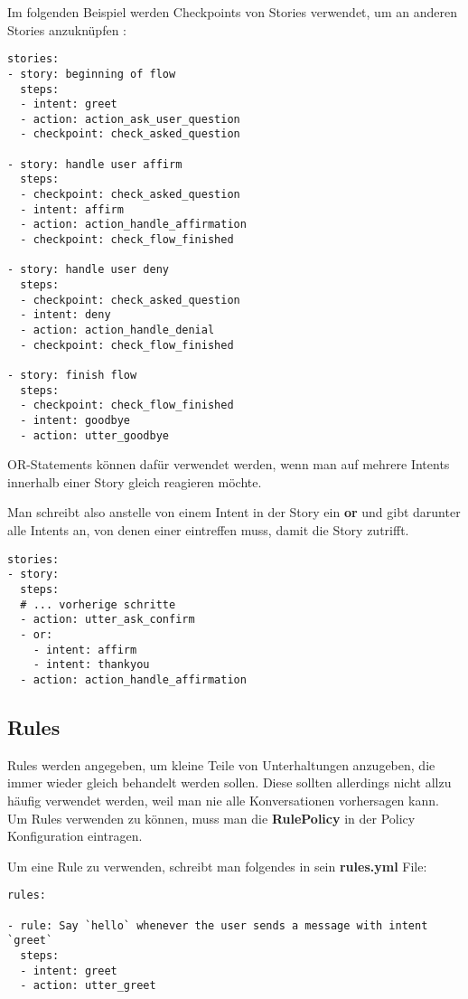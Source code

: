 Im folgenden Beispiel werden Checkpoints von Stories verwendet, um an anderen Stories anzuknüpfen
\cite{checkpoints}
:

\begin{lstlisting}[label={lst: Checkpoints Example}]
stories:
- story: beginning of flow
  steps:
  - intent: greet
  - action: action_ask_user_question
  - checkpoint: check_asked_question

- story: handle user affirm
  steps:
  - checkpoint: check_asked_question
  - intent: affirm
  - action: action_handle_affirmation
  - checkpoint: check_flow_finished

- story: handle user deny
  steps:
  - checkpoint: check_asked_question
  - intent: deny
  - action: action_handle_denial
  - checkpoint: check_flow_finished

- story: finish flow
  steps:
  - checkpoint: check_flow_finished
  - intent: goodbye
  - action: utter_goodbye
\end{lstlisting}

OR-Statements können dafür verwendet werden, wenn man auf mehrere Intents innerhalb einer Story gleich reagieren möchte.
\cite{orStatements}

Man schreibt also anstelle von einem Intent in der Story ein \textbf{or} und gibt darunter alle Intents an, von denen einer eintreffen muss, damit die Story zutrifft.

\begin{lstlisting}[label={lst: OR Example}]
stories:
- story:
  steps:
  # ... vorherige schritte
  - action: utter_ask_confirm
  - or:
    - intent: affirm
    - intent: thankyou
  - action: action_handle_affirmation
\end{lstlisting}

\subsection{Rules}

Rules werden angegeben, um kleine Teile von Unterhaltungen anzugeben, die immer wieder gleich behandelt werden sollen.
Diese sollten allerdings nicht allzu häufig verwendet werden, weil man nie alle Konversationen vorhersagen kann.
Um Rules verwenden zu können, muss man die \textbf{RulePolicy} in der Policy Konfiguration eintragen.
\cite{rules}

Um eine Rule zu verwenden, schreibt man folgendes in sein \textbf{rules.yml} File:

\begin{lstlisting}[label={lst: Rules Example}]
rules:

- rule: Say `hello` whenever the user sends a message with intent `greet`
  steps:
  - intent: greet
  - action: utter_greet
\end{lstlisting}



